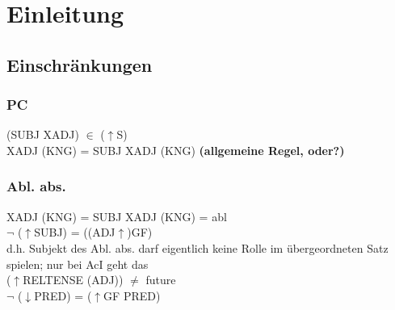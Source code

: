 \documentclass[12pt,a4paper]{article}
\begin{document}

\setcounter{page}{2}
\begingroup
\flushbottom
\tableofcontents
\thispagestyle{empty}
\pagebreak
\endgroup
\section{Einleitung}
\nocite{lucil1}
\nocite{lucil2} 
\nocite{original}
\nocite{seneca66} 
\nocite{hachmann1995} 
\nocite{bartsch}  
\nocite{philatinFLU} 
\nocite{becker1893sittlichen} 
\nocite{cancik} 
\nocite{inwood}
\nocite{edwards}
\nocite{motto} 
\nocite{becker1893sittlichen}
\nocite{philatinAUDIS}


\subsection{Einschränkungen}

\subsubsection{PC}

(SUBJ XADJ) $\in$ ($\uparrow$S)\\
XADJ (KNG) = SUBJ XADJ (KNG) \textbf{(allgemeine Regel, oder?)} \\

\subsubsection{Abl. abs.}

XADJ (KNG) = SUBJ XADJ (KNG) = abl\\
$\neg$ ($\uparrow$SUBJ) = ((ADJ$\uparrow$)GF) \\
d.h. Subjekt des Abl. abs. darf eigentlich keine Rolle im übergeordneten Satz spielen; nur bei AcI geht das\\
($\uparrow$RELTENSE (ADJ)) $\neq$ future \\
$\neg$ ($\downarrow$PRED) = ($\uparrow$GF PRED)\\
\end{document}
